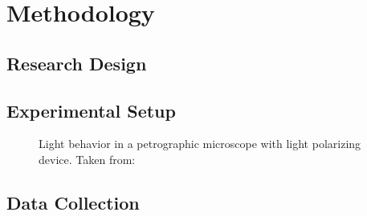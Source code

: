\chapter{Methodology}
\label{ch:methods}

\blindtext

\section{Research Design}
\label{sec:research-design}

\blindtext

\section{Experimental Setup}
\label{sec:experimental-setup}

\blindtext
%
\begin{figure}
	\centering
	\resizebox{0.9\textwidth}{!}{%
		
	}
	\caption[
	Light behavior in a petrographic microscope with light polarizing
	device
	]{
		Light behavior in a petrographic microscope with light polarizing
		device. Taken from:
	}
\end{figure}
%
\blindtext

\section{Data Collection}
\label{sec:data-collection}

\blindtext